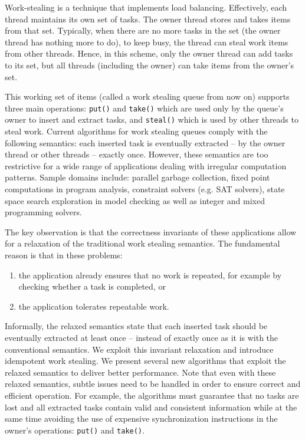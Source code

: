Work-stealing is a technique that implements load balancing.
Effectively, each thread maintains its own set of tasks. The owner
thread stores and takes items from that set. Typically, when there are
no more tasks in the set (the owner thread has nothing more to do), to
keep busy, the thread can steal work items from other threads. Hence,
in this scheme, only the owner thread can add tasks to its set, but
all threads (including the owner) can take items from the owner's set.

This working set of items (called a work stealing queue from now on)
supports three main operations: \lstinline!put()! and \lstinline!take()!
which are used only by the queue's owner to insert and extract tasks,
and \lstinline!steal()! which is used by other threads to steal work.
Current algorithms for work stealing queues comply with the following
semantics: each inserted task is eventually extracted -- by the owner
thread or other threads -- exactly once. However, these semantics are
too restrictive for a wide range of applications dealing with
irregular computation patterns. Sample domains include: parallel
garbage collection, fixed point computations in program analysis,
constraint solvers (e.g. SAT solvers), state space search exploration
in model checking as well as integer and mixed programming solvers.

The key observation is that the correctness invariants of these
applications allow for a relaxation of the traditional work stealing
semantics. The fundamental reason is that in these problems:

\begin{enumerate}
\item the application already ensures that no work is repeated, for
  example by checking whether a task is completed, or
\item the application tolerates repeatable work.
\end{enumerate}

Informally, the relaxed semantics state that each inserted task should
be eventually extracted at least once -- instead of exactly once as it
is with the conventional semantics. We exploit this invariant
relaxation and introduce idempotent work stealing. We present several
new algorithms that exploit the relaxed semantics to deliver better
performance. Note that even with these relaxed semantics, subtle
issues need to be handled in order to ensure correct and efficient
operation. For example, the algorithms must guarantee that no tasks
are lost and all extracted tasks contain valid and consistent
information while at the same time avoiding the use of expensive
synchronization instructions in the owner's operations:
\lstinline!put()! and \lstinline!take()!.

